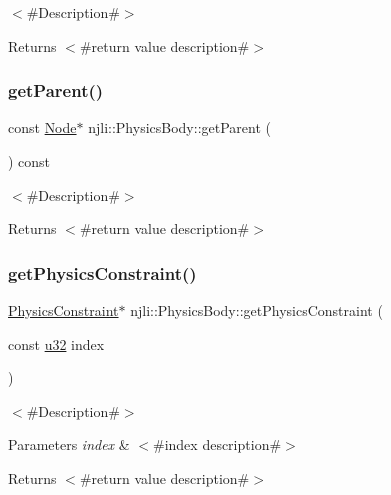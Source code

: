 $<$\#\+Description\#$>$

\begin{DoxyReturn}{Returns}
$<$\#return value description\#$>$ 
\end{DoxyReturn}
\mbox{\label{classnjli_1_1_physics_body_adb2a13498a34dadc69c7746d88ca4a79}} 
\subsubsection{\texorpdfstring{get\+Parent()}{getParent()}\hspace{0.1cm}{\footnotesize\ttfamily [2/2]}}
{\footnotesize\ttfamily const \mbox{\hyperlink{classnjli_1_1_node}{Node}}$\ast$ njli\+::\+Physics\+Body\+::get\+Parent (\begin{DoxyParamCaption}{ }\end{DoxyParamCaption}) const}

$<$\#\+Description\#$>$

\begin{DoxyReturn}{Returns}
$<$\#return value description\#$>$ 
\end{DoxyReturn}
\mbox{\label{classnjli_1_1_physics_body_aa4e623ba19115b05486b415929a32016}} 
\subsubsection{\texorpdfstring{get\+Physics\+Constraint()}{getPhysicsConstraint()}\hspace{0.1cm}{\footnotesize\ttfamily [1/2]}}
{\footnotesize\ttfamily \mbox{\hyperlink{classnjli_1_1_physics_constraint}{Physics\+Constraint}}$\ast$ njli\+::\+Physics\+Body\+::get\+Physics\+Constraint (\begin{DoxyParamCaption}\item[{const \mbox{\hyperlink{_util_8h_a10e94b422ef0c20dcdec20d31a1f5049}{u32}}}]{index }\end{DoxyParamCaption})}

$<$\#\+Description\#$>$


\begin{DoxyParams}{Parameters}
{\em index} & $<$\#index description\#$>$\\
\hline
\end{DoxyParams}
\begin{DoxyReturn}{Returns}
$<$\#return value description\#$>$ 
\end{DoxyReturn}
\mbox{\label{classnjli_1_1_physics_body_ad0f774812e46bf37b786adf13b00ab4f}} 
